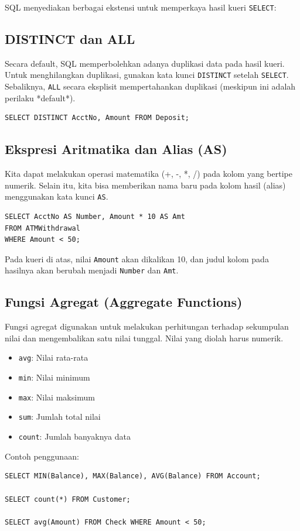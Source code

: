 \documentclass[11pt,a4paper]{article}
\begin{document}
SQL menyediakan berbagai ekstensi untuk memperkaya hasil kueri \texttt{SELECT}:

\subsection{DISTINCT dan ALL}
Secara default, SQL memperbolehkan adanya duplikasi data pada hasil kueri. Untuk menghilangkan duplikasi, gunakan kata kunci \texttt{DISTINCT} setelah \texttt{SELECT}. Sebaliknya, \texttt{ALL} secara eksplisit mempertahankan duplikasi (meskipun ini adalah perilaku *default*).
\begin{lstlisting}
SELECT DISTINCT AcctNo, Amount FROM Deposit;
\end{lstlisting}

\subsection{Ekspresi Aritmatika dan Alias (AS)}
Kita dapat melakukan operasi matematika (+, -, *, /) pada kolom yang bertipe numerik. Selain itu, kita bisa memberikan nama baru pada kolom hasil (alias) menggunakan kata kunci \texttt{AS}.
\begin{lstlisting}
SELECT AcctNo AS Number, Amount * 10 AS Amt
FROM ATMWithdrawal
WHERE Amount < 50;
\end{lstlisting}
Pada kueri di atas, nilai \texttt{Amount} akan dikalikan 10, dan judul kolom pada hasilnya akan berubah menjadi \texttt{Number} dan \texttt{Amt}.

\subsection{Fungsi Agregat (Aggregate Functions)}
Fungsi agregat digunakan untuk melakukan perhitungan terhadap sekumpulan nilai dan mengembalikan satu nilai tunggal. Nilai yang diolah harus numerik.
\begin{itemize}
	\item \texttt{avg}: Nilai rata-rata
	\item \texttt{min}: Nilai minimum
	\item \texttt{max}: Nilai maksimum
	\item \texttt{sum}: Jumlah total nilai
	\item \texttt{count}: Jumlah banyaknya data
\end{itemize}

Contoh penggunaan:
\begin{lstlisting}
SELECT MIN(Balance), MAX(Balance), AVG(Balance) FROM Account;

SELECT count(*) FROM Customer;

SELECT avg(Amount) FROM Check WHERE Amount < 50;
\end{lstlisting}
\end{document}
